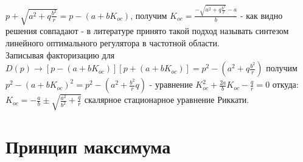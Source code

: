 \documentclass[preprint,russian,a5paper,10pt,twoside,mediummath]{ncc}
\begin{document}
$p+\sqrt{{{a}^{2}}+q\frac{{{b}^{2}}}{r}}=p-\left( a+b{{K}_{oc}} \right)$, получим ${{K}_{oc}}=\frac{-\sqrt{{{a}^{2}}+q\frac{{{b}^{2}}}{r}}-a}{b}$ - как видно решения совпадают - в литературе принято такой подход называть синтезом линейного оптимального регулятора в частотной области.
\\Записывая факторизацию для $D\left( p \right)\to \left[ p-\left( a+b{{K}_{oc}} \right) \right]\left[ p+\left( a+b{{K}_{oc}} \right) \right]={{p}^{2}}-\left( {{a}^{2}}+q\frac{{{b}^{2}}}{r} \right)$ получим ${{p}^{2}}-{{\left( a+b{{K}_{oc}} \right)}^{2}}={{p}^{2}}-\left( {{a}^{2}}+\frac{{{b}^{2}}}{r}q \right)$ - уравнение $K_{oc}^{2}+\frac{2a}{b}{{K}_{oc}}-\frac{q}{r}=0$ откуда:  ${{K}_{oc}}=-\frac{a}{b}\pm \sqrt{\frac{{{a}^{2}}}{{{b}^{2}}}+\frac{q}{r}}$ скалярное стационарное уравнение Риккати.

\clearpage
\section{Принцип максимума\label{maximum}}
\end{document}
